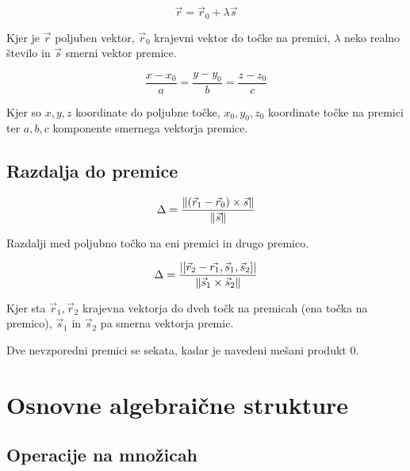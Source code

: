 
\[
	\vec{r} = \vec{r}_0 + \lambda \vec{s}
\]

Kjer je $\vec{r}$ poljuben vektor, $\vec{r}_0$ krajevni vektor do točke na premici, $\lambda$ neko realno število in $\vec{s}$ smerni vektor premice.

\[
	\frac{x-x_0}{a} = \frac{y-y_0}{b} = \frac{z-z_0}{c}
\]

Kjer so $x, y, z$ koordinate do poljubne točke, $x_0, y_0, z_0$ koordinate točke na premici ter $a, b, c$ komponente smernega vektorja premice.

\subsection{Razdalja do premice}


\[
	\Delta = \frac{\| (\vec{r}_1 - \vec{r}_0) \times \vec{s} \|}{\| \vec{s} \|}
\]


Razdalji med poljubno točko na eni premici in drugo premico.


\[
	\Delta = \frac{\left|[\vec{r}_2 - \vec{r_1}, \vec{s}_1, \vec{s}_2]\right|}{\| \vec{s}_1 \times \vec{s}_2 \|}
\]

Kjer sta $\vec{r}_1, \vec{r}_2$ krajevna vektorja do dveh točk na premicah (ena točka na premico), $\vec{s}_1$ in $\vec{s}_2$ pa smerna vektorja premic.

Dve nevzporedni premici se sekata, kadar je navedeni mešani produkt $0$.

\section{Osnovne algebraične strukture}

\subsection{Operacije na množicah}


